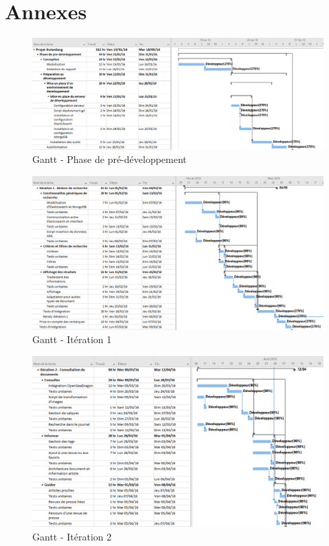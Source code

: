 \section{Annexes}
\label{sec:annexes}

	\begin{figure}[H]
        \centering
        \includegraphics[width=\textwidth, angle=90]{figure/gantt1.png}
            \caption{Gantt - Phase de pré-développement}
            \label{fig:gantt}
    \end{figure}

    \begin{figure}[H]
        \centering
        \includegraphics[width=\textwidth, angle=90]{figure/gantt2.png}
            \caption{Gantt - Itération 1}
            \label{fig:gantt}
    \end{figure}

    \begin{figure}[H]
        \centering
        \includegraphics[width=\textwidth, angle=90]{figure/gantt3.png}
            \caption{Gantt - Itération 2}
            \label{fig:gantt}
    \end{figure}

